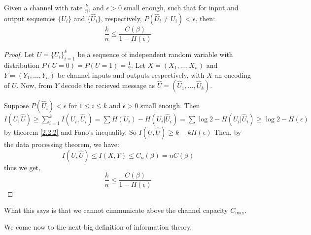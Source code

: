 \begin{lemma}\label{3.2.2}
    Given a channel with rate $\frac{k}{n}$, and $\epsilon>0$ small enough, such
    that for input and output sequences  $\{U_i\}$ and $\{\hat{U}_i\}$,
    respectively, $P(\hat{U}_i \neq U_i)<\epsilon$, then:
    \begin{equation}
        \frac{k}{n} \leq \frac{C(\beta)}{1-H(\epsilon)}
    \end{equation}
\end{lemma}
\begin{proof}
    Let $U=\{U_i\}_{i=1}^k$ be a sequence of independent random variable with
    distribution $P(U=0)=P(U=1)=\frac{1}{2}$. Let $X=(X_1, \dots, X_n)$ and $Y=(Y_1,
    \dots, Y_n)$ be channel inputs and outputs respectively, with $X$ an encoding of
     $U$. Now, from  $Y$ decode the recieved message as  $\hat{U}=(\hat{U}_1, \dots,
    \hat{U}_k)$.

    Suppose $P(\hat{U}_i)<\epsilon$ for $1 \leq i \leq k$ and  $\epsilon>0$ small
    enough. Then  $I(U,\hat{U}) \geq \sum_{i=1}^k{I(U_i,
    \hat{U}_i)}=\sum{H(U_i)-H(U_i|\hat{U}_i)}=\sum{\log{2}-H(U_i|\hat{U}_i)} \geq
    \log{2}-H(\epsilon)$ by theorem \ref{2.2.2} and Fano's inequality. So
    $I(U,\hat{U}) \geq k-kH(\epsilon)$ Then, by the data processing theorem, we
    have:
    \begin{equation*}
        I(U,\hat{U}) \leq I(X,Y) \leq C_n(\beta)=nC(\beta)
    \end{equation*}
    thus we get,
    \begin{equation*}
        \frac{k}{n} \leq \frac{C(\beta)}{1-H(\epsilon)}
    \end{equation*}
\end{proof}
\begin{remark}
    What this says is that we cannot cimmunicate above the channel capacity
    $C_{\max}$.
\end{remark}

We come now to the next big definition of information theory.

